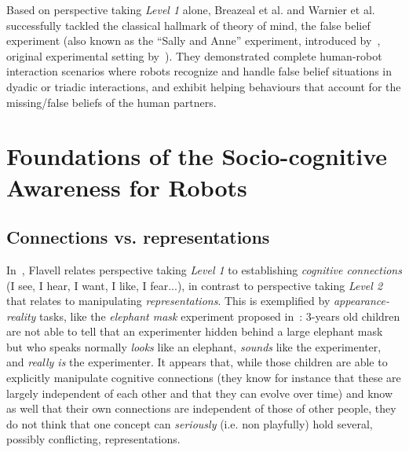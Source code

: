 \documentclass[a4paper]{article}
\newcommand{\etal}{et al.\xspace}
\newcommand{\ie}{i.e.\xspace}
\begin{document}
Based on perspective taking \emph{Level 1} alone, Breazeal
\etal\cite{breazeal2009embodied} and Warnier \etal\cite{warnier2012when}
successfully tackled the classical hallmark of theory of mind, the false belief
experiment (also known as the ``Sally and Anne'' experiment, introduced
by~\cite{wimmer1983beliefs}, original experimental setting
by~\cite{baron1985does}). They demonstrated complete human-robot interaction
scenarios where robots recognize and handle false belief situations in dyadic or
triadic interactions, and exhibit helping behaviours that account for the
missing/false beliefs of the human partners.

\cite{devin2016implemented}



\section{Foundations of the Socio-cognitive Awareness for Robots}

\subsection{Connections vs. representations}
\label{connection-representation}

In~\cite{flavell1990developmental}, Flavell relates perspective taking
\emph{Level 1} to establishing \emph{cognitive connections} (I see, I hear, I
want, I like, I fear...), in contrast to perspective taking \emph{Level 2} that
relates to manipulating \emph{representations}.  This is exemplified by
\emph{appearance-reality} tasks, like the \emph{elephant mask} experiment
proposed in~\cite{flavell1990developmental}: 3-years old children are not able
to tell that an experimenter hidden behind a large elephant mask but who speaks
normally \emph{looks} like an elephant, \emph{sounds} like the experimenter, and
\emph{really is} the experimenter.  It appears that, while those children are
able to explicitly manipulate cognitive connections (they know for instance that
these are largely independent of each other and that they can evolve over time)
and know as well that their own connections are independent of those of other
people, they do not think that one concept can \emph{seriously} (\ie non
playfully) hold several, possibly conflicting, representations.
\end{document}
